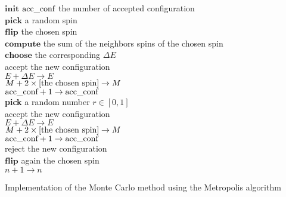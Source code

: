\documentclass[a4paper, twoside, 11pt]{report}
\theoremstyle{theorem}
\theoremstyle{remark}
\theoremstyle{exemple}
\begin{document}
        \begin{center}
            \begin{algorithm}[H]
            
            \SetAlgoLined
            
                $\textbf{init}$ $\textnormal{acc\_conf}$ the number of accepted configuration\\
                    {
                        $\textbf{pick}$ a random spin\\
                        $\textbf{flip}$ the chosen spin\\
                        $\textbf{compute}$ the sum of the neighbors spins of the chosen spin\\
                        $\textbf{choose}$ the corresponding $\Delta E$ \\                
                
                        {
                            accept the new configuration\\
                            $E + \Delta E \rightarrow E$\\
                            $M + 2 \times \textnormal{[the chosen spin]} \rightarrow M$\\
                            $\textnormal{acc\_conf} + 1 \rightarrow \textnormal{acc\_conf}$\\
                        }{
                            \textbf{pick} a random number $r \in [0,1]$\\
                            {
                                accept the new configuration\\
                                $E + \Delta E \rightarrow E$\\
                                $M + 2 \times \textnormal{[the chosen spin]} \rightarrow M$\\
                                $\textnormal{acc\_conf} + 1 \rightarrow \textnormal{acc\_conf}$\\                                
                            }{
                                reject the new configuration\\
                                $\textbf{flip}$ again the chosen spin\\
                            }
                        }
                        $n + 1 \rightarrow n$
                    }
              
            \caption{Implementation of the Monte Carlo method using the Metropolis algorithm}
            \end{algorithm}
        \end{center}        
        
\end{document}
